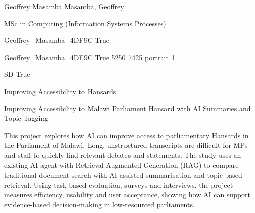 \documentclass[twoside]{report}
\begin{document}
\begingroup{}\relax



\def\Key{Geoffrey_Masamba_4DF9C}

{Geoffrey Masamba}
{Masamba, Geoffrey}

{MSc in Computing (Information Systems Processes)}

{Geoffrey_Masamba_4DF9C}
{True}

{Geoffrey_Masamba_4DF9C}
{True}
{5250}
{7425}
{portrait}
{1}

{SD}
{True}

{Improving Accessibility to Hansards}

{Improving Accessibility to Malawi Parliament Hansard with AI Summaries and Topic Tagging}

{This project explores how AI can improve access to parliamentary Hansards in the Parliament of Malawi. Long, unstructured transcripts are difficult for MPs and staff to quickly find relevant debates and statements. The study uses an existing AI agent with Retrieval Augmented Generation (RAG) to compare traditional document search with AI-assisted summarisation and topic-based retrieval. Using task-based evaluation, surveys and interviews, the project measures efficiency, usability and user acceptance, showing how AI can support evidence-based decision-making in low-resourced parliaments.}
\end{document}
